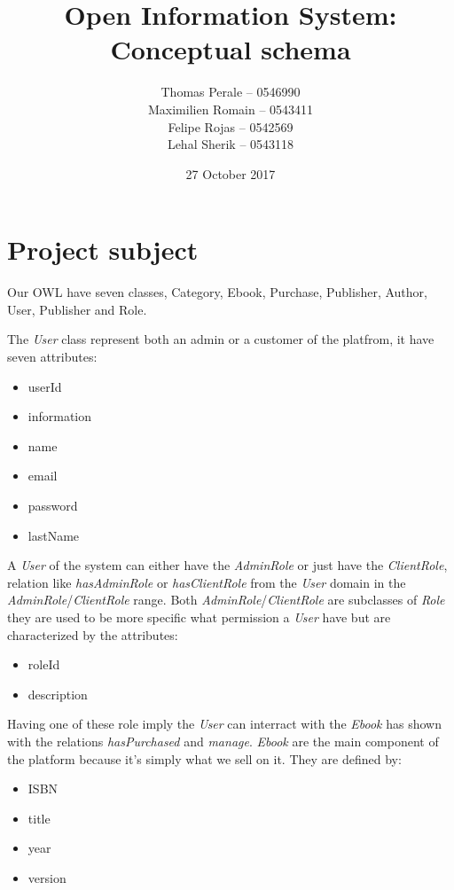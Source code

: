 \documentclass[a4paper,11pt]{article}
\begin{document}
\title{Open Information System: Conceptual schema}
\author{Thomas Perale -- 0546990\\Maximilien Romain -- 0543411\\Felipe Rojas -- 0542569\\Lehal Sherik -- 0543118}
\date{27 October 2017}

\maketitle

\section{Project subject}

Our OWL have seven classes, Category, Ebook, Purchase, Publisher, Author, User, Publisher and Role.

The \emph{User} class represent both an admin or a customer of the platfrom, it have seven attributes:

\begin{itemize}
  \item userId
  \item information
  \item name
  \item email
  \item password
  \item lastName
\end{itemize}

A \emph{User} of the system can either have the \emph{AdminRole} or just have the \emph{ClientRole},
relation like \emph{hasAdminRole} or \emph{hasClientRole} from the \emph{User} domain in the
\emph{AdminRole}/\emph{ClientRole} range.
Both \emph{AdminRole}/\emph{ClientRole} are subclasses of \emph{Role} they are used to be more specific
what permission a \emph{User} have but are characterized by the attributes:

\begin{itemize}
  \item roleId
  \item description
\end{itemize}

Having one of these role imply the \emph{User} can interract with the \emph{Ebook} has shown with
the relations \emph{hasPurchased} and \emph{manage}. \emph{Ebook} are the main component of the platform
because it's simply what we sell on it. They are defined by:

\begin{itemize}
  \item ISBN
  \item title
  \item year
  \item version
\end{itemize}
\end{document}
